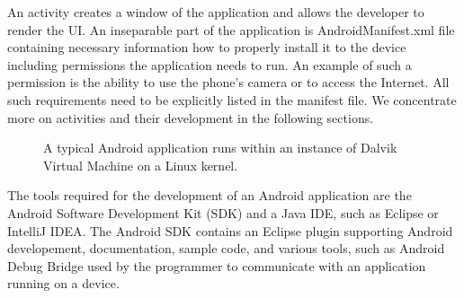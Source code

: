 An activity creates a window of the application and allows the developer to render the UI.
An inseparable part of the application is AndroidManifest\@.xml file containing necessary information how to properly install it to the device 
including permissions the application needs to run. 
An example of such a permission is the ability to use the phone's camera or to access the Internet.
All such requirements need to be explicitly listed in the manifest file.
We concentrate more on activities and their development in the following sections.
\begin{figure}[h!]
    \caption{A typical Android application runs within an instance of Dalvik Virtual Machine on a Linux kernel.} %
\end{figure}

The tools required for the development of an Android application are the Android Software Development Kit (SDK) and a Java IDE, such as Eclipse or IntelliJ IDEA. 
The Android SDK contains an Eclipse plugin supporting Android developement, documentation, sample code, and various tools, such as Android Debug Bridge used by the programmer to communicate with an application running on a device. 


